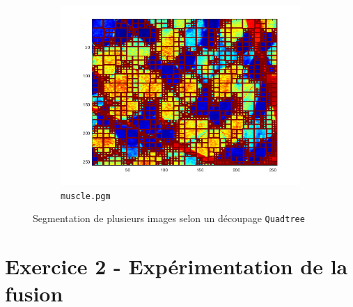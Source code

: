 \documentclass[a4paper]{article}
\begin{document}
\begin{figure}[H]
\begin{subfigure}[c]{0.6\textwidth}
        \centering
        \includegraphics[width=\textwidth]{images/ex1_muscle.png}
        \caption{\texttt{muscle.pgm}}
    \label{subfig:ex1_muscle}
    \end{subfigure}

    \caption{Segmentation de plusieurs images selon un découpage
    \texttt{Quadtree}} 
    \label{fig:ex1}
\end{figure}

\section*{Exercice 2 - Expérimentation de la fusion}
\end{document}
